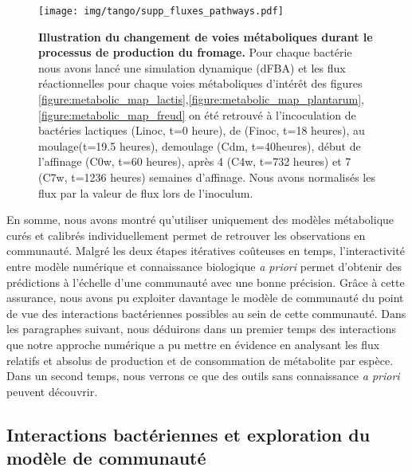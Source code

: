 \begin{figure}[H]
    \centering
    \texttt{[image: img/tango/supp\_fluxes\_pathways.pdf]}
    \caption{\textbf{Illustration du changement de voies métaboliques durant le processus de production du fromage.} Pour chaque bactérie nous avons lancé une simulation dynamique (dFBA) et les flux réactionnelles pour chaque voies métaboliques d'intérêt des figures \ref{figure:metabolic_map_lactis},\ref{figure:metabolic_map_plantarum},\ref{figure:metabolic_map_freud} on été retrouvé à l'incoculation de bactéries lactiques (Linoc, t=0 heure), de \freud (Finoc, t=18 heures), au moulage(t=19.5 heures), demoulage (Cdm, t=40heures), début de l'affinage (C0w, t=60 heures), après 4 (C4w, t=732 heures) et 7 (C7w, t=1236 heures) semaines d'affinage. Nous avons normalisés les flux par la valeur de flux lors de l'inoculum.}
    \label{fig:switch_metabolic_pathway}
\end{figure}

En somme, nous avons montré qu'utiliser uniquement des modèles métabolique curés et calibrés individuellement permet de retrouver les observations en communauté. Malgré les deux étapes itératives coûteuses en temps, l'interactivité entre modèle numérique et connaissance biologique \textit{a priori} permet d'obtenir des prédictions à l'échelle d'une communauté avec une bonne précision. Grâce à cette assurance, nous avons pu exploiter davantage le modèle de communauté du point de vue des interactions bactériennes possibles au sein de cette communauté. Dans les paragraphes suivant, nous déduirons dans un premier temps des interactions que notre approche numérique a pu mettre en évidence en analysant les flux relatifs et absolus de production et de consommation de métabolite par espèce. Dans un second temps, nous verrons ce que des outils sans connaissance \textit{a priori} peuvent découvrir.  \\

\subsection{Interactions bactériennes et exploration du modèle de communauté}


